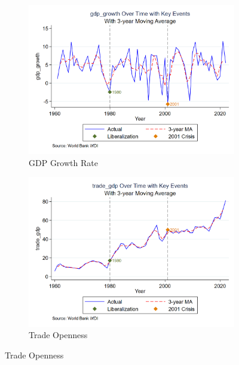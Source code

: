 \documentclass[12pt,a4paper]{article}
\theoremstyle{definition}
\begin{document}
\begin{figure}[H]
\centering
\caption{Economic Indicators Over Time}
\begin{subfigure}{.48\textwidth}
\centering
\includegraphics[width=\textwidth]{output/gdp_growth_advanced_trend.png}
\caption{GDP Growth Rate}
\end{subfigure}
\begin{subfigure}{.48\textwidth}
\centering
\includegraphics[width=\textwidth]{output/trade_gdp_advanced_trend.png}
\caption{Trade Openness}
\end{subfigure}


\end{figure}
\end{document}
